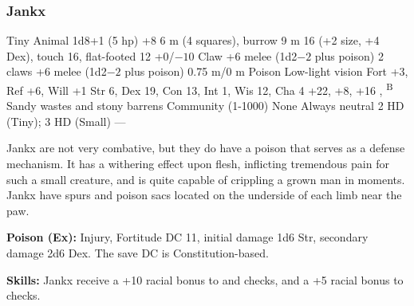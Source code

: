 \subsubsection{Jankx}
\begin{MonsterStats}
{Tiny Animal}
{1d8+1 (5 hp)}
{+8}
{6 m (4 squares), burrow 9 m}
{16 (+2 size, +4 Dex), touch 16, flat-footed 12}
{+0/$-10$}
{Claw +6 melee (1d2$-2$ plus poison)}
{2 claws +6 melee (1d2$-2$ plus poison)}
{0.75 m/0 m}
{Poison}
{Low-light vision}
{Fort +3, Ref +6, Will +1}
{Str 6, Dex 19, Con 13, Int 1, Wis 12, Cha 4}
{ +22,  +8,  +16}
{, \textsuperscript{B}}
{Sandy wastes and stony barrens}
{Community (1-1000)}
{\onehalf}
{None}
{Always neutral}
{2 HD (Tiny); 3 HD (Small)}
{---}
\end{MonsterStats}


Jankx are not very combative, but they do have a poison that serves as a defense mechanism. It has a withering effect upon flesh, inflicting tremendous pain for such a small creature, and is quite capable of crippling a grown man in moments. Jankx have spurs and poison sacs located on the underside of each limb near the paw.

\textbf{Poison (Ex):} Injury, Fortitude DC 11, initial damage 1d6 Str, secondary damage 2d6 Dex. The save DC is Constitution-based.

\textbf{Skills:} Jankx receive a +10 racial bonus to  and  checks, and a +5 racial bonus to  checks.

